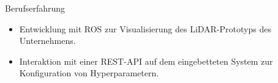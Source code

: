 \begin{rubric}{Berufserfahrung}
\vspace{\CVItemizeHeaderSpacing} \begin{itemize}[leftmargin=*, rightmargin=1cm]
	\setlength{\itemsep}{\CVItemizeSpacing}  
	\item Entwicklung mit ROS zur Visualisierung des LiDAR-Prototyps des Unternehmens.  
	\item Interaktion mit einer REST-API auf dem eingebetteten System zur Konfiguration von Hyperparametern.  
\end{itemize}
\begin{comment}
%
%
\entry*[] \textbf{Creative Edge LLC} \hfill 08.2017 -- 09.2018 \newline  
 \emph{Softwareentwickler} \hfill Denver, USA \newline  
\vspace{\CVItemizeHeaderSpacing} \begin{itemize}[leftmargin=*, rightmargin=1cm] 
	\setlength{\itemsep}{\CVItemizeSpacing}  
	\item Entwicklung von Anwendungen für das Kryptowährungs-Mining unter Windows und Linux.  
	\item Erstellung von Software zur Verwaltung von Betriebssystemtreibern,  System- ~~~~~~~~~~~~konfigurationen und Tools von Drittanbietern.  
\end{itemize}
\end{comment}

\end{rubric}
